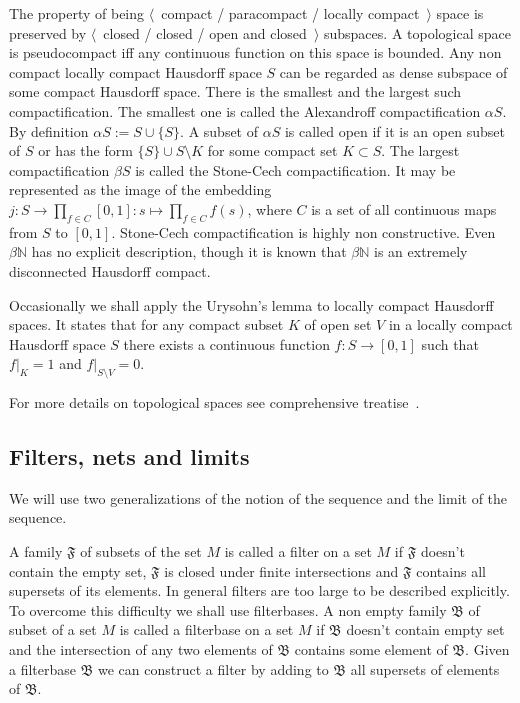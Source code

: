The property of being $\langle$~compact / paracompact / locally
compact~$\rangle$ space is preserved by $\langle$~closed / closed / open and
closed~$\rangle$ subspaces. A topological space is pseudocompact iff any
continuous function on this space is bounded. Any non compact locally compact
Hausdorff space $S$ can be regarded as dense subspace of some compact Hausdorff
space. There is the smallest and the largest such compactification. The smallest
one is called the Alexandroff compactification $\alpha S$.  By definition
$\alpha S:=S\cup  \{S \}$. A subset of $\alpha S$ is called open if it is an
open subset of $S$ or has the form $ \{S \}\cup S\setminus K$ for some compact
set $K\subset S$. The largest compactification $\beta S$ is called the
Stone-Cech compactification. It may be represented as the image of the embedding
$j:S\to\prod_{f\in C}[0,1]:s\mapsto \prod_{f\in C}f(s)$, where $C$ is a set of
all continuous maps from $S$ to $[0,1]$. Stone-Cech compactification is highly
non constructive. Even $\beta\mathbb{N}$ has no explicit description, though it
is known that $\beta\mathbb{N}$ is an extremely disconnected Hausdorff compact.

Occasionally we shall apply the Urysohn's lemma to locally compact Hausdorff
spaces. It states that for any compact subset $K$ of open set $V$ in a locally
compact Hausdorff space $S$ there exists a continuous function $f:S\to [0,1]$
such that $f|_K=1$ and $f|_{S\setminus V}=0$. 

For more details on topological spaces see comprehensive
treatise~\cite{EngelGenTop}. 


\subsection{
  Filters, nets and limits
}\label{SubSectionFiltersNetsAndLimits} 

We will use two generalizations of the notion of the sequence and the limit of
the sequence.

A family $\mathfrak{F}$ of subsets of the set $M$ is called a filter on a set
$M$ if $\mathfrak{F}$ doesn't contain the empty set, $\mathfrak{F}$ is closed
under finite intersections and $\mathfrak{F}$ contains all supersets of its
elements. In general filters are too large to be described explicitly. To
overcome this difficulty we shall use filterbases. A non empty family
$\mathfrak{B}$ of subset of a set $M$ is called a filterbase on a set $M$ if
$\mathfrak{B}$ doesn't contain empty set and the intersection of any two
elements of $\mathfrak{B}$ contains some element of $\mathfrak{B}$. Given a
filterbase $\mathfrak{B}$ we can construct a filter by adding to $\mathfrak{B}$
all supersets of elements of $\mathfrak{B}$.

